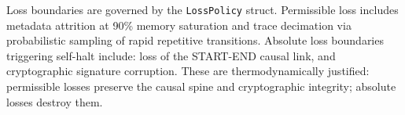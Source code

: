 Loss boundaries are governed by the \texttt{LossPolicy} struct. Permissible loss
includes metadata attrition at 90\% memory saturation and trace decimation via
probabilistic sampling of rapid repetitive transitions. Absolute loss boundaries
triggering self-halt include: loss of the START-END causal link, and cryptographic
signature corruption. These are thermodynamically justified: permissible losses preserve
the causal spine and cryptographic integrity; absolute losses destroy them.

